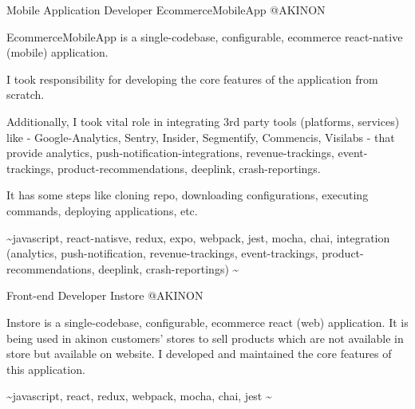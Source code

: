 \begin{cventries}
  \cventry
    {Mobile Application Developer} %
    {EcommerceMobileApp} %
    {@AKINON} %
    {}
    {
      \begin{cvitems} %
        \item {EcommerceMobileApp is a single-codebase, configurable, ecommerce react-native (mobile) application.}
        \item {I took responsibility for developing the core features of the application from scratch.}
        \item {Additionally, I took vital role in integrating 3rd party tools (platforms, services) like - Google-Analytics, Sentry, Insider, Segmentify, Commencis, Visilabs - that provide analytics, push-notification-integrations, revenue-trackings, event-trackings, product-recommendations, deeplink, crash-reportings.}
        \item {It has some steps like cloning repo, downloading configurations, executing commands, deploying applications, etc.}
        \item {\textasciitilde javascript, react-natisve, redux, expo, webpack, jest, mocha, chai, integration (analytics, push-notification, revenue-trackings, event-trackings, product-recommendations, deeplink, crash-reportings) \textasciitilde}
      \end{cvitems}
    }

  \cventry
    {Front-end Developer} %
    {Instore} %
    {@AKINON} %
    {}
    {
      \begin{cvitems} %
        \item {Instore is a single-codebase, configurable, ecommerce react (web) application. It is being used in akinon customers' stores to sell products which are not available in store but available on website. I developed and maintained the core features of this application.}
        \item {\textasciitilde javascript, react, redux, webpack, mocha, chai, jest \textasciitilde}
      \end{cvitems}
    }



\end{cventries}
